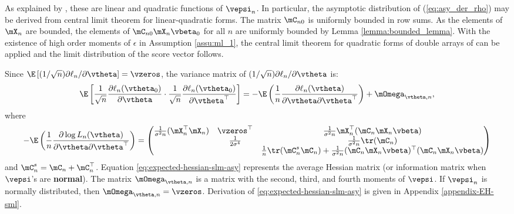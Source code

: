 As explained by \citet[][pag. 1905]{lee2004asymptotic}, these are linear and quadratic functions of $\vepsi_n$. In particular, the asymptotic distribution of (\ref{eq:asy_der_rho}) may be derived from central limit theorem for linear-quadratic forms. The matrix $\mC_{n0}$ is uniformly bounded in row sums. As the elements of $\mX_n$ are bounded, the elements of $\mC_{n0}\mX_n\vbeta_0$ for all $n$ are uniformly bounded by Lemma \ref{lemma:bounded_lemma}. With the existence of high order moments of $\epsilon$ in Assumption \ref{assu:ml_1}, the central limit theorem for quadratic forms of double arrays of \cite{kelejian2001asymptotic} can be applied and the limit distribution of the score vector follows.

Since $\E\left[(1 / \sqrt{n}) \partial \ell_n /\partial \vtheta\right]  = \vzeros$,  the variance matrix of $(1 / \sqrt{n}) \partial \ell_n /\partial \vtheta$ is:
\begin{equation}
  \E\left[\frac{1}{\sqrt{n}}\frac{\partial \ell_n (\vtheta_0)}{\partial \vtheta}\cdot\frac{1}{\sqrt{n}}\frac{\partial \ell_n (\vtheta_0)}{\partial \vtheta^\top} \right] = - \E\left(\frac{1}{n} \frac{\partial \ell_n(\vtheta)}{\partial \vtheta \partial \vtheta^\top}\right) + \mOmega_{\vtheta, n},
\end{equation}
%
where 
\begin{equation}\label{eq:expected-hessian-slm-asy}
- \E\left(\frac{1}{n} \frac{\partial \log L_n(\vtheta)}{\partial \vtheta \partial \vtheta^\top}\right)= 
	\begin{pmatrix}
	\frac{1}{\sigma^2n}(\mX_n^\top \mX_n) & \vzeros^\top & \frac{1}{\sigma^2n} \mX_n^\top (\mC_n\mX_n\vbeta) \\
		 &  \frac{1}{2\sigma^4} & \frac{1}{\sigma^2n} \tr(\mC_n)\\
		 &  & \frac{1}{n}\tr(\mC^s_n\mC_n) + \frac{1}{\sigma^2n}(\mC_n\mX_n\vbeta)^\top(\mC_n\mX_n\vbeta)
	\end{pmatrix} 
\end{equation}
%
and $\mC^s_n = \mC_n + \mC_n^\top$. Equation \ref{eq:expected-hessian-slm-asy} represents the average Hessian matrix (or information matrix when $\vepsi$'s are \textbf{normal}). The matrix $ \mOmega_{\vtheta, n}$ is a matrix with the second, third, and fourth moments of $\vepsi$. If $\vepsi_n$ is normally distributed, then $\mOmega_{\vtheta, n} = \vzeros$. Derivation of \ref{eq:expected-hessian-slm-asy} is given in Appendix \ref{appendix-EH-sml}.

